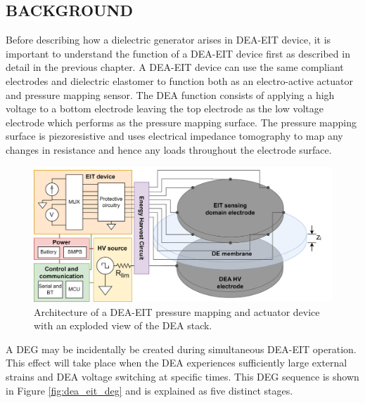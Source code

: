 \subsection{BACKGROUND} 
\label{subsec:background}
Before describing how a dielectric generator arises in DEA-EIT device, it is important to understand the function of a DEA-EIT device first as  described in detail in the previous chapter. A DEA-EIT device can use the same compliant electrodes and dielectric elastomer to function both as an electro-active actuator and pressure mapping sensor. The DEA function consists of applying a high voltage to a bottom electrode leaving the top electrode as the low voltage electrode which performs as the pressure mapping surface. The pressure mapping surface is piezoresistive and uses electrical impedance tomography to map any changes in resistance and hence any loads throughout the electrode surface. 
\begin{figure}[H]
	\centering
	\includegraphics[width=0.9\linewidth]{Figures/DEA-EIT_architecture_v2.png}
	\vspace{0.3cm}
	\caption{Architecture of a DEA-EIT pressure mapping and actuator device with an exploded view of the DEA stack.}
	\label{fig:dea-eit-architecture-w-MCU}
\end{figure}

A DEG may be incidentally be created during simultaneous DEA-EIT operation. This effect will take place when the DEA experiences sufficiently large external strains and DEA voltage switching at specific times. This DEG sequence is shown in Figure \ref{fig:dea_eit_deg} and is explained as five distinct stages.

